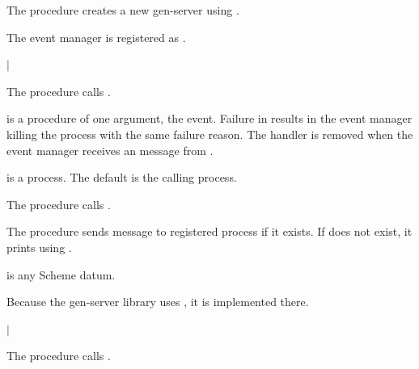 The  procedure creates a new
 gen-server using .

The event manager is registered as .

\begin{procedure}
\end{procedure}
\returns{}  $|$ 

The  procedure calls
.

 is a procedure of one argument, the event. Failure in
 results in the event manager killing the 
process with the same failure reason. The handler is removed when the
event manager receives an  message from .

 is a process. The default is the calling process.

\begin{procedure}
\end{procedure}
\returns{} 

The  procedure calls
.

\begin{procedure}
\end{procedure}
\returns{} 

The  procedure sends message
 to registered process
 if it exists. If  does not exist,
it prints  using
.

 is any Scheme datum.

Because the gen-server library uses , it is
implemented there.

\begin{procedure}
\end{procedure}
\returns{}  $|$ 

The  procedure calls
.

